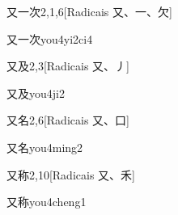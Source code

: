 \begin{entry}{又一次}{2,1,6}[Radicais ⼜、⼀、⽋]
  \begin{phonetics}{又一次}{you4yi2ci4}
  \end{phonetics}
\end{entry}

\begin{entry}{又及}{2,3}[Radicais ⼜、⼃]
  \begin{phonetics}{又及}{you4ji2}
  \end{phonetics}
\end{entry}

\begin{entry}{又名}{2,6}[Radicais ⼜、⼝]
  \begin{phonetics}{又名}{you4ming2}
  \end{phonetics}
\end{entry}

\begin{entry}{又称}{2,10}[Radicais ⼜、⽲]
  \begin{phonetics}{又称}{you4cheng1}
  \end{phonetics}
\end{entry}


